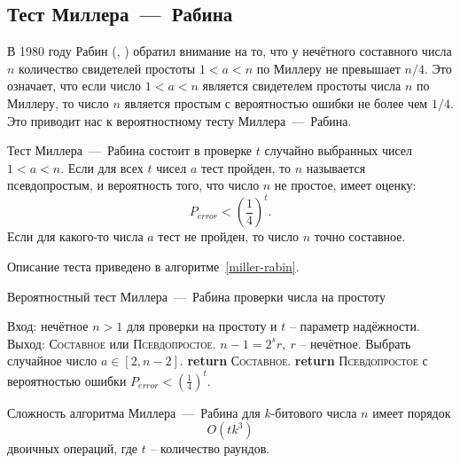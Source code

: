\subsection{Тест Миллера~---~Рабина}\label{section-prime-check-miller-rabin}

В 1980 году Рабин (, \cite{Rabin:1980}) обратил внимание на то, что у нечётного составного числа $n$ количество свидетелей простоты $1 < a < n$ по Миллеру не превышает $n/4$. Это означает, что если число $1 < a < n$ является свидетелем простоты числа $n$ по Миллеру, то число $n$ является простым с вероятностью ошибки не более чем $1/4$. Это приводит нас к вероятностному тесту Миллера~---~Рабина.

Тест Миллера~---~Рабина состоит в проверке $t$ случайно выбранных чисел $1 < a < n$. Если для всех $t$ чисел $a$ тест пройден, то $n$ называется псевдопростым, и вероятность того, что число $n$ не простое, имеет оценку:
    \[ P_{error} < \left( \frac{1}{4} \right)^t. \]
Если для какого-то числа $a$ тест не пройден, то число $n$ точно составное.

Описание теста приведено в алгоритме~\ref{miller-rabin}.

\begin{algorithm}[ht]
    \caption{Вероятностный тест Миллера~---~Рабина проверки числа на простоту\label{miller-rabin}}
    \begin{algorithmic}
        \STATE Вход: нечётное $n>1$ для проверки на простоту и $t$ -- параметр надёжности.
        \STATE Выход: \textsc{Составное} или \textsc{Псевдопростое}.
        \STATE $n - 1 = 2^s r, ~ r$ -- нечётное.
            \STATE Выбрать случайное число $a \in [2, n-2]$.
               \STATE \textbf{return} \textsc{Составное}.
           \ENDIF
        \ENDFOR
       \STATE \textbf{return} \textsc{Псевдопростое} с вероятностью ошибки $P_{error} < \left( \frac{1}{4} \right)^t$.
    \end{algorithmic}
\end{algorithm}

Сложность алгоритма Миллера~---~Рабина для $k$-битового числа $n$ имеет порядок
    \[ O(t k^3) \]
двоичных операций, где $t$ -- количество раундов.

